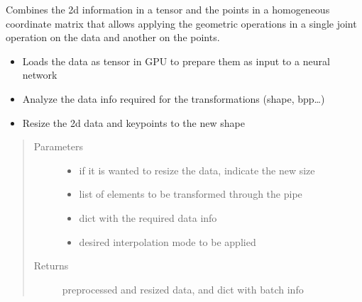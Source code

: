 \documentclass[letterpaper,10pt,english]{sphinxmanual}
\begin{document}
\begin{fulllineitems}
\label{\detokenize{ida_lib.core:ida_lib.core.pipeline_functional.preprocess_data}}
Combines the 2d information in a tensor and the points in a homogeneous coordinate matrix     that allows applying the geometric operations in a single joint operation on the data     and another on the points.
\begin{itemize}
\item {} 
Loads the data as tensor in GPU to prepare them as input to a neural network

\item {} 
Analyze the data info required for the transformations (shape, bpp…)

\item {} 
Resize the 2d data and keypoints to the new shape

\end{itemize}
\begin{quote}\begin{description}
\item[{Parameters}] \leavevmode\begin{itemize}
\item {} 
 \textendash{} if it is wanted to resize the data, indicate the new size

\item {} 
 \textendash{} list of elements to be transformed through the pipe

\item {} 
 \textendash{} dict with the required data info

\item {} 
 \textendash{} desired interpolation mode to be applied

\end{itemize}

\item[{Returns}] \leavevmode
preprocessed and resized data, and dict with batch info

\end{description}\end{quote}

\end{fulllineitems}
\end{document}
